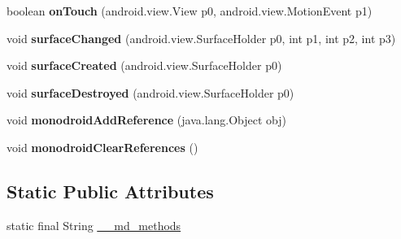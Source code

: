 \begin{DoxyCompactItemize}
\mbox{\label{classmd59e336b20c5f59a4196ec0611a339f132_1_1MonoGameAndroidGameView_a574a983b913852eb965497673d67a3bd}} 
boolean {\bfseries on\+Touch} (android.\+view.\+View p0, android.\+view.\+Motion\+Event p1)
\item 
\mbox{\label{classmd59e336b20c5f59a4196ec0611a339f132_1_1MonoGameAndroidGameView_a5d27d47c32eed53cff5ad9521fc91896}} 
void {\bfseries surface\+Changed} (android.\+view.\+Surface\+Holder p0, int p1, int p2, int p3)
\item 
\mbox{\label{classmd59e336b20c5f59a4196ec0611a339f132_1_1MonoGameAndroidGameView_a8d593311faa1ab0e3a50884479c8ebf0}} 
void {\bfseries surface\+Created} (android.\+view.\+Surface\+Holder p0)
\item 
\mbox{\label{classmd59e336b20c5f59a4196ec0611a339f132_1_1MonoGameAndroidGameView_a3bb35fcf680b00000834771b5e5b1691}} 
void {\bfseries surface\+Destroyed} (android.\+view.\+Surface\+Holder p0)
\item 
\mbox{\label{classmd59e336b20c5f59a4196ec0611a339f132_1_1MonoGameAndroidGameView_a5b72650c4e26916db66c1634a4966b09}} 
void {\bfseries monodroid\+Add\+Reference} (java.\+lang.\+Object obj)
\item 
\mbox{\label{classmd59e336b20c5f59a4196ec0611a339f132_1_1MonoGameAndroidGameView_a0be403f1b25f7d5e55df4111bf014ea9}} 
void {\bfseries monodroid\+Clear\+References} ()
\end{DoxyCompactItemize}
\subsection*{Static Public Attributes}
\begin{DoxyCompactItemize}
\item 
static final String \hyperlink{classmd59e336b20c5f59a4196ec0611a339f132_1_1MonoGameAndroidGameView_a1dce1e7b3d29d79650ed8273d1cdf59e}{\+\_\+\+\_\+md\+\_\+methods}
\end{DoxyCompactItemize}
